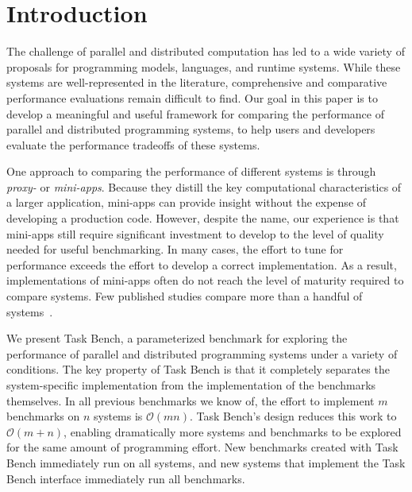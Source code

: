 \section{Introduction}
\label{sec:introduction}

The challenge of parallel and distributed computation has led to a
wide variety of proposals for programming models, languages, and
runtime systems. While these systems are well-represented in the literature, comprehensive and comparative performance evaluations
remain difficult to find. Our
goal in this paper is to develop a meaningful and useful framework for
comparing the performance of parallel and distributed programming
systems, to help users and developers evaluate the performance tradeoffs of these systems.

One approach to comparing the performance of different systems is through \emph{proxy-} or
\emph{mini-apps}. Because they distill the key computational characteristics of a larger
application, mini-apps can provide insight
without the expense of developing a production code. However, despite the name, our experience is that
mini-apps still require significant investment to develop
to the level of quality needed for useful benchmarking. In many cases,
the effort to tune for performance exceeds the effort to develop a correct implementation. As a result, implementations of mini-apps
often do not reach the level of maturity required to compare
systems. Few published studies compare more than a handful of systems~\cite{LULESH13}.

We present Task Bench, a parameterized benchmark for exploring the performance
of parallel and distributed programming systems under a
variety of conditions.  The key property of Task Bench is that it completely separates
the system-specific implementation from the implementation
of the benchmarks themselves.
In all previous benchmarks we know of, the effort to implement $m$ benchmarks on $n$
systems is $\mathcal{O}(mn)$.  Task Bench's design reduces this work to $\mathcal{O}(m + n)$,
enabling dramatically more systems and benchmarks to be explored for the same amount of programming
effort.  New benchmarks created with Task Bench
immediately run on all systems, and new systems that implement the Task Bench interface immediately run all
benchmarks. 

